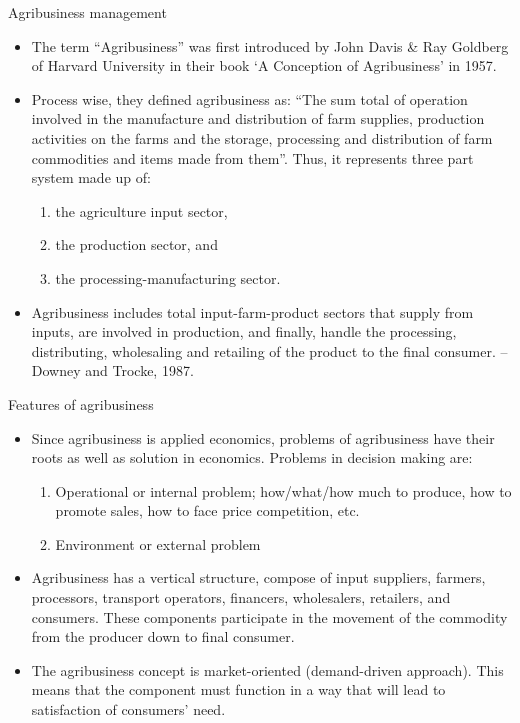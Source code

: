 \documentclass[12pt,ignorenonframetext,aspectratio=169]{beamer}
\providecommand{\tightlist}{%
  \setlength{\itemsep}{0pt}\setlength{\parskip}{0pt}}
\begin{document}
\begin{frame}{Agribusiness management}
\protect\hypertarget{agribusiness-management}{}
\begin{itemize}
\tightlist
\item
  The term ``Agribusiness'' was first introduced by John Davis \& Ray
  Goldberg of Harvard University in their book `A Conception of
  Agribusiness' in 1957.
\item
  Process wise, they defined agribusiness as: ``The sum total of
  operation involved in the manufacture and distribution of farm
  supplies, production activities on the farms and the storage,
  processing and distribution of farm commodities and items made from
  them''. Thus, it represents three part system made up of:

  \begin{enumerate}
  \tightlist
  \item
    the agriculture input sector,
  \item
    the production sector, and
  \item
    the processing-manufacturing sector.
  \end{enumerate}
\item
  Agribusiness includes total input-farm-product sectors that supply
  from inputs, are involved in production, and finally, handle the
  processing, distributing, wholesaling and retailing of the product to
  the final consumer. -- Downey and Trocke, 1987.
\end{itemize}
\end{frame}

\begin{frame}{Features of agribusiness}
\protect\hypertarget{features-of-agribusiness}{}
\begin{itemize}
\tightlist
\item
  Since agribusiness is applied economics, problems of agribusiness have
  their roots as well as solution in economics. Problems in decision
  making are:

  \begin{enumerate}
  \tightlist
  \item
    Operational or internal problem; how/what/how much to produce, how
    to promote sales, how to face price competition, etc.
  \item
    Environment or external problem
  \end{enumerate}
\item
  Agribusiness has a vertical structure, compose of input suppliers,
  farmers, processors, transport operators, financers, wholesalers,
  retailers, and consumers. These components participate in the movement
  of the commodity from the producer down to final consumer.
\item
  The agribusiness concept is market-oriented (demand-driven approach).
  This means that the component must function in a way that will lead to
  satisfaction of consumers' need.
\end{itemize}
\end{frame}
\end{document}
